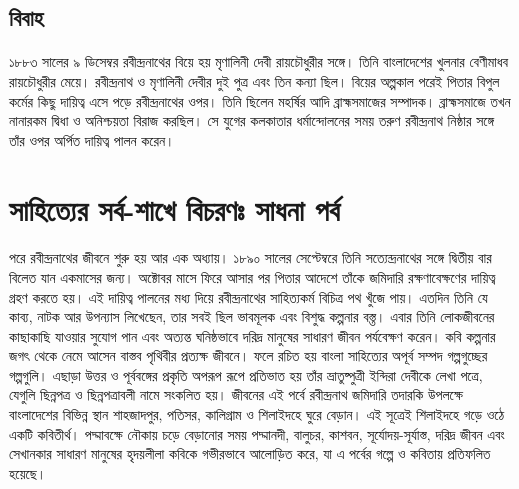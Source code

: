 \documentclass{article}
\begin{document}
\subsection{বিবাহ}
\paragraph{}
১৮৮৩ সালের ৯ ডিসেম্বর রবীন্দ্রনাথের বিয়ে হয় মৃণালিনী দেবী রায়চৌধুরীর সঙ্গে। তিনি বাংলাদেশের খুলনার বেণীমাধব রায়চৌধুরীর মেয়ে। রবীন্দ্রনাথ ও মৃণালিনী দেবীর দুই পুত্র এবং তিন কন্যা ছিল। বিয়ের অল্পকাল পরেই পিতার বিপুল কর্মের কিছু দায়িত্ব এসে পড়ে রবীন্দ্রনাথের ওপর। তিনি ছিলেন মহর্ষির আদি ব্রাহ্মসমাজের সম্পাদক। ব্রাহ্মসমাজে তখন নানারকম দ্বিধা ও অনিশ্চয়তা বিরাজ করছিল। সে যুগের কলকাতার ধর্মান্দোলনের সময় তরুণ রবীন্দ্রনাথ নিষ্ঠার সঙ্গে তাঁর ওপর অর্পিত দায়িত্ব পালন করেন।

\section{সাহিত্যের সর্ব-শাখে বিচরণঃ সাধনা পর্ব}
\paragraph{}
পরে রবীন্দ্রনাথের জীবনে শুরু হয় আর এক অধ্যায়। ১৮৯০ সালের সেপ্টেম্বরে তিনি সত্যেন্দ্রনাথের সঙ্গে দ্বিতীয় বার বিলেত যান একমাসের জন্য। অক্টোবর মাসে ফিরে আসার পর পিতার আদেশে তাঁকে জমিদারি রক্ষণাবেক্ষণের দায়িত্ব গ্রহণ করতে হয়। এই দায়িত্ব পালনের মধ্য দিয়ে রবীন্দ্রনাথের সাহিত্যকর্ম বিচিত্র পথ খুঁজে পায়। এতদিন তিনি যে কাব্য, নাটক আর উপন্যাস লিখেছেন, তার সবই ছিল ভাবমূলক এবং বিশুদ্ধ কল্পনার বস্ত্ত। এবার তিনি লোকজীবনের কাছাকাছি যাওয়ার সুযোগ পান এবং অত্যন্ত ঘনিষ্ঠভাবে দরিদ্র মানুষের সাধারণ জীবন পর্যবেক্ষণ করেন। কবি কল্পনার জগৎ থেকে নেমে আসেন বাস্তব পৃথিবীর প্রত্যক্ষ জীবনে। ফলে রচিত হয় বাংলা সাহিত্যের অপূর্ব সম্পদ গল্পগুচ্ছের গল্পগুলি। এছাড়া উত্তর ও পূর্ববঙ্গের প্রকৃতি অপরূপ রূপে প্রতিভাত হয় তাঁর ভ্রাতুষ্পুত্রী ইন্দিরা দেবীকে লেখা পত্রে, যেগুলি ছিন্নপত্র ও ছিন্নপত্রাবলী নামে সংকলিত হয়। জীবনের এই পর্বে রবীন্দ্রনাথ জমিদারি তদারকি উপলক্ষে বাংলাদেশের বিভিন্ন স্থান শাহজাদপুর, পতিসর, কালিগ্রাম ও শিলাইদহে ঘুরে বেড়ান। এই সূত্রেই শিলাইদহে গড়ে ওঠে একটি কবিতীর্থ। পদ্মাবক্ষে নৌকায় চড়ে বেড়ানোর সময় পদ্মানদী, বালুচর, কাশবন, সূর্যোদয়-সূর্যাস্ত, দরিদ্র জীবন এবং সেখানকার সাধারণ মানুষের হৃদয়লীলা কবিকে গভীরভাবে আলোড়িত করে, যা এ পর্বের গল্পে ও কবিতায় প্রতিফলিত হয়েছে।
\end{document}
